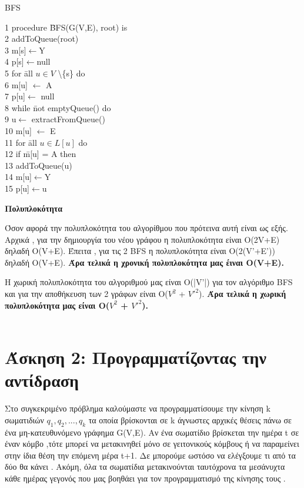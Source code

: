 \documentclass[12pt,a4paper]{article}
\begin{document}
\begin{mybox}{BFS}
\begin{tabbing}
 1 procedure \=BFS(G(V,Ε), root) is \\
 2      \>addToQueue(root)\\
 3      \>m[s]$\leftarrow$Y\\
 4      \>p[s]$\leftarrow$null\\
 5      \>for \=all $u \in V$ \textbackslash \{s\} do \\
 6           \>\>m[u] $\leftarrow$ A\\
 7           \>\>p[u]$\leftarrow$ null \\
 8      \>while \=  not emptyQueue() do\\
 9          \>\>u$\leftarrow$ extractFromQueue() \\
 10         \>\>m[u] $\leftarrow$ E\\
 11         \>\>for \=all $u \in L[u]$ do\\
12         \>\>\>if \=m[u] = A then\\
13                  \>\>\>\>addToQueue(u)\\
14                   \>\>\>\>m[u]$\leftarrow$Y\\
15                   \>\>\>\>p[u]$\leftarrow$u
\end{tabbing}
\end{mybox}
\newpage
\begin{center}
    \textbf{Πολυπλοκότητα}
\end{center}

Όσον αφορά την πολυπλοκότητα του αλγορίθμου που πρότεινα αυτή είναι ως εξής. Αρχικά , για την δημιουργία του νέου γράφου η πολυπλοκότητα είναι O(2V+E) δηλαδή O(V+E). Έπειτα , για τις 2 BFS η πολυπλοκότητα είναι Ο(2(V'+E')) δηλαδή O(V+E). \textbf{Άρα τελικά η χρονική πολυπλοκότητα μας έιναι Ο(V+E).} \\
\par H χωρική πολυπλοκότητα του αλγοριθμού μας είναι O(|V'|) για τον αλγόριθμο BFS και για την αποθήκευση των 2 γράφων είναι O($V^2$ + ${V'}^2$).\textbf{ Άρα τελικά η χωρική πολυπλοκότητα μας είναι O($V^2$ + ${V'}^2$).}\\\\

\section*{Άσκηση 2: Προγραμματίζοντας την αντίδραση }

\par 
Στο συγκεκριμένο πρόβλημα καλούμαστε να προγραμματίσουμε την κίνηση k σωματιδιών $q_1,q_2,...,q_k$
τα οποία βρίσκονται σε k άγνωστες αρχικές θέσεις πάνω σε ένα μη-κατευθυνόμενο γράφημα G(V,E). Αν ένα σωματίδιο βρίσκεται την ημέρα t σε έναν κόμβο ,τότε μπορεί να μετακινηθεί μόνο σε γειτονικούς κόμβους ή να παραμείνει στην ίδια θέση την επόμενη μέρα t+1. Δε μπορούμε ωστόσο να ελέγξουμε τι από τα δύο θα κάνει . Ακόμη, όλα τα σωματίδια μετακινούνται ταυτόχρονα τα μεσάνυχτα κάθε ημέρας γεγονός που μας βοηθάει για τον προγραμματισμό της κίνησης τους . \\ 
\end{document}

